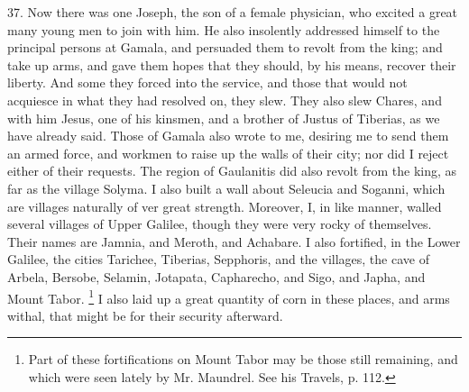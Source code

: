 37. Now there was one Joseph, the son of a female physician, who excited a
great many young men to join with him. He also insolently addressed
himself to the principal persons at Gamala, and persuaded them to revolt
from the king; and take up arms, and gave them hopes that they should, by
his means, recover their liberty. And some they forced into the service,
and those that would not acquiesce in what they had resolved on, they
slew. They also slew Chares, and with him Jesus, one of his kinsmen, and a
brother of Justus of Tiberias, as we have already said. Those of Gamala
also wrote to me, desiring me to send them an armed force, and workmen to
raise up the walls of their city; nor did I reject either of their
requests. The region of Gaulanitis did also revolt from the king, as far
as the village Solyma. I also built a wall about Seleucia and Soganni,
which are villages naturally of ver great strength. Moreover, I, in like
manner, walled several villages of Upper Galilee, though they were very
rocky of themselves. Their names are Jamnia, and Meroth, and Achabare. I
also fortified, in the Lower Galilee, the cities Tarichee, Tiberias,
Sepphoris, and the villages, the cave of Arbela, Bersobe, Selamin,
Jotapata, Capharecho, and Sigo, and Japha, and Mount Tabor. \footnote{Part of these
fortifications on Mount Tabor may be those still remaining, and which were
seen lately by Mr. Maundrel. See his Travels, p. 112.}
I also laid up a great quantity of corn in these places, and arms withal,
that might be for their security afterward.

